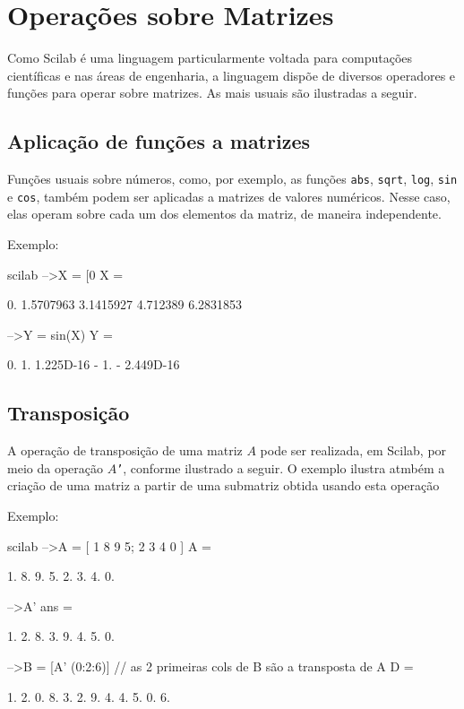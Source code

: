 \documentclass[11pt,fleqn]{practice}
\begin{document}
\section{Operações sobre Matrizes}

Como Scilab é uma linguagem particularmente voltada para computações científicas e nas áreas de engenharia, a linguagem dispõe de diversos operadores e funções para operar sobre matrizes. As mais usuais são ilustradas a seguir.

\subsection{Aplicação de funções a matrizes}

Funções usuais sobre números, como, por exemplo, as funções \texttt{abs}, \texttt{sqrt}, \texttt{log}, \texttt{sin} e \texttt{cos}, também podem ser aplicadas a matrizes de valores numéricos. Nesse caso, elas operam sobre cada um dos elementos da matriz, de maneira independente.

Exemplo:
\begin{lst}{scilab}
-->X = [0 %
 X  =
 
    0.    1.5707963    3.1415927    4.712389    6.2831853  
 
-->Y = sin(X)
 Y  =
 
    0.    1.    1.225D-16  - 1.  - 2.449D-16  
\end{lst}

\subsection{Transposição}

A operação de transposição de uma matriz $A$ pode ser realizada, em Scilab, por meio da operação  \texttt{$A$'}, conforme ilustrado a seguir. O exemplo ilustra atmbém a criação de uma matriz a partir de uma submatriz obtida usando esta operação

Exemplo:
\begin{lst}{scilab}
-->A = [ 1 8 9 5; 2 3 4 0 ]
 A  =
 
    1.    8.    9.    5.  
    2.    3.    4.    0.  
 
-->A'
 ans  =
 
    1.    2.  
    8.    3.  
    9.    4.  
    5.    0.

-->B = [A'  (0:2:6)]     // as 2 primeiras cols de B são a transposta de A        
 D  =
 
     1.     2.     0.
     8.     3.     2.
     9.     4.     4.
     5.     0.     6.
\end{lst}
\end{document}
